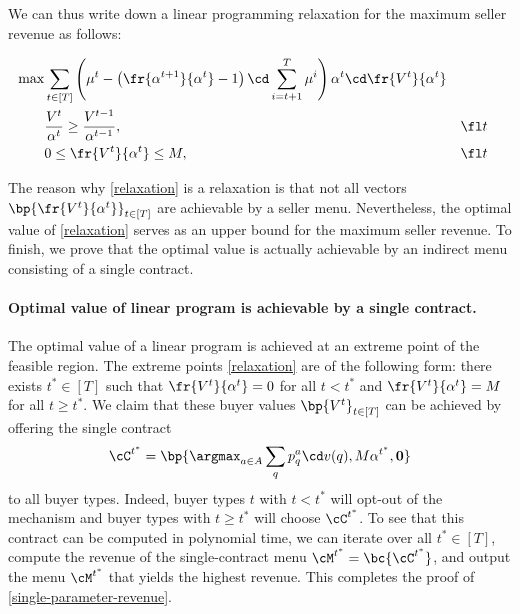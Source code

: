 We can thus write down a linear programming relaxation for the maximum seller revenue as follows:

\begin{tcolorbox}[title=Linear program for maximum revenue with variables $\bp{\fr{V^t}{\alpha^t}}_{t\in [T]}$]
    \begin{align}
    \max & \sum_{t\in [T]} \left(\mu^t -  \left(\fr{\alpha^{t+1}}{\alpha^t} - 1\right) \cd \sum_{i=t+1}^T  \mu^i  \right) \alpha^t \cd \fr{V^t}{\alpha^t}  \label{relaxation}\\
    &  \frac{V^t}{\alpha^t} \geq \frac{V^{t-1}}{\alpha^{t-1}}, &&  \fl t  \notag\\
    & 0\le \fr{V^t}{\alpha^t} \le M, && \fl t \notag
\end{align}
\end{tcolorbox}

The reason why \cref{relaxation} is a relaxation is that not all vectors $\bp{\fr{V^t}{\alpha^t}}_{t\in [T]}$ are achievable by a seller menu. Nevertheless, the optimal value of \cref{relaxation} serves as an upper bound for the maximum seller revenue. To finish, we prove that the optimal value is actually achievable by an indirect menu consisting of a single contract.

\paragraph{Optimal value of linear program is achievable by a single contract.}

The optimal value of a linear program is achieved at an extreme point of the feasible region. The extreme points \cref{relaxation} are of the following form: there exists $t^*\in [T]$ such that $\fr{V^t}{\alpha^t} = 0$ for all $t < t^*$ and $\fr{V^t}{\alpha^t} = M$ for all $t \ge t^*$. We claim that these buyer values $\bp{V^t}_{t\in [T]}$ can be achieved by offering the single contract $$\cC^{t^*} = \bp{\argmax_{a\in A} \sum_q p^a_q \cd v(q), M \alpha^{t^*}, \mathbf{0}}$$ to all buyer types. Indeed, buyer types $t$ with $t<t^*$ will opt-out of the mechanism and buyer types with $t \ge t^*$ will choose $\cC^{t^*}$. To see that this contract can be computed in polynomial time, we can iterate over all $t^*\in [T]$, compute the revenue of the single-contract menu $\cM^{t^*} = \bc{\cC^{t^*}}$, and output the menu $\cM^{t^*}$ that yields the highest revenue. This completes the proof of \cref{single-parameter-revenue}.

